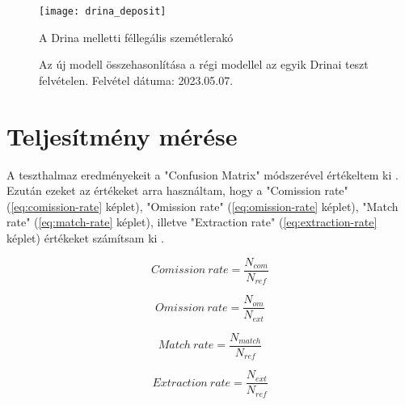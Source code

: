 \begin{figure}[H]
	\centering
	\texttt{[image: drina\_deposit]}
	\caption{A Drina melletti féllegális szemétlerakó \cite{petkupa2024}}
    \label{fig:drina-deposit}
\end{figure}

\begin{figure}[H]
	\centering
	\hspace{5pt}
	\hspace{5pt}
	\caption{Az új modell összehasonlítása a régi modellel az egyik Drinai teszt felvételen. Felvétel dátuma: 2023.05.07.}
	\label{fig:old-vs-new}
\end{figure}

\section{Teljesítmény mérése}

A teszthalmaz eredményekeit a "Confusion Matrix" módszerével értékeltem ki \cite{CONGALTON199135}. Ezután ezeket az értékeket arra használtam, hogy a "Comission rate" (\ref{eq:comission-rate} képlet), "Omission rate" (\ref{eq:omission-rate} képlet), "Match rate" (\ref{eq:match-rate} képlet), illetve "Extraction rate" (\ref{eq:extraction-rate} képlet) értékeket számítsam ki \cite{Fekete2021}.

\begin{equation}\label{eq:comission-rate}
    Comission \ rate = \frac{N_{com}}{N_{ref}}
\end{equation}

\begin{equation}\label{eq:omission-rate}
    Omission \ rate = \frac{N_{om}}{N_{ext}}
\end{equation}

\begin{equation}\label{eq:match-rate}
    Match \ rate = \frac{N_{match}}{N_{ref}}
\end{equation}

\begin{equation}\label{eq:extraction-rate}
    Extraction \ rate = \frac{N_{ext}}{N_{ref}}
\end{equation}

